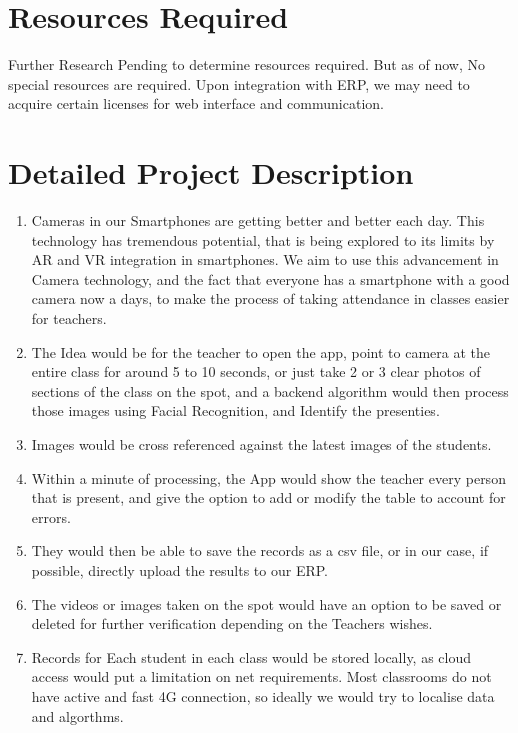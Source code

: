 \documentclass[11pt]{article}
\begin{document}
\section{Resources Required}
Further Research Pending to determine resources required. But as of now, No special resources are required. Upon integration with ERP, we may need to acquire certain licenses for web interface and communication. 

\section{Detailed Project Description}
\begin{enumerate}
    \item Cameras in our Smartphones are getting better and better each day. This technology has tremendous potential, that is being explored to its limits by AR and VR integration in smartphones. We aim to use this advancement in Camera technology, and the fact that everyone has a smartphone with a good camera now a days, to make the process of taking attendance in classes easier for teachers. 
    \item The Idea would be for the teacher to open the app, point to camera at the entire class for around 5 to 10 seconds, or just take 2 or 3 clear photos of sections of the class on the spot, and a backend algorithm would then process those images using Facial Recognition, and Identify the presenties. 
    \item Images would be cross referenced against the latest images of the students. 
    \item Within a minute of processing, the App would show the teacher every person that is present, and give the option to add or modify the table to account for errors. 
    \item They would then be able to save the records as a csv file, or in our case, if possible, directly upload the results to our ERP. 
    \item The videos or images taken on the spot would have an option to be saved or deleted for further verification depending on the Teachers wishes. 
    \item Records for Each student in each class would be stored locally, as cloud access would put a limitation on net requirements. Most classrooms do not have active and fast 4G connection, so ideally we would try to localise data and algorthms. 
\end{enumerate}
\end{document}
